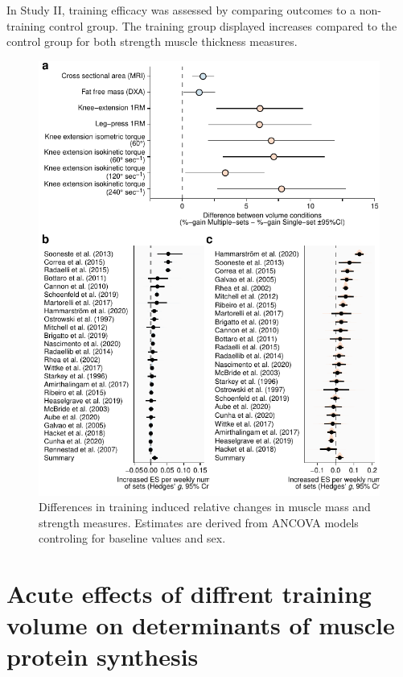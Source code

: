 \documentclass[twoside,10pt]{gihclass} %
\begin{document}
In Study II, training efficacy was assessed by comparing outcomes to a non-training control group. The training group displayed increases compared to the control group for both strength muscle thickness measures.
\begin{figure}

{\centering \includegraphics{thesis_files/figure-latex/comb-fig-s1-1} 

}

\caption[Differences in training induced changes to muscle mass and strength measures between volume conditions in Study I]{Differences in training induced relative changes in muscle mass and strength measures. Estimates are derived from ANCOVA models controling for baseline values and sex.}\label{fig:comb-fig-s1}
\end{figure}
\hypertarget{acute-effects-of-diffrent-training-volume-on-determinants-of-muscle-protein-synthesis}{%
\section{Acute effects of diffrent training volume on determinants of muscle protein synthesis}\label{acute-effects-of-diffrent-training-volume-on-determinants-of-muscle-protein-synthesis}}
\end{document}
